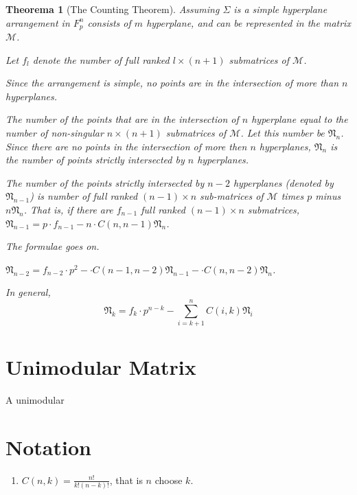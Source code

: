\documentclass[12pt, a4paper]{article}
\newtheorem{theorem}{Theorema}[subsection]
\theoremstyle{definition}
\theoremstyle{remark}
\begin{document}
\begin{theorem}[The Counting Theorem]
	Assuming $\Sigma$ is a simple hyperplane arrangement in $F_p^n$ consists of $m$ hyperplane, and can be represented in the matrix $\mathcal{M}$. 

	Let $f_{l}$ denote the number of full ranked $l \times (n
	+ 1)$ submatrices of $\mathcal{M}$.

	Since the arrangement is simple, no points are in the intersection of more than $n$ hyperplanes. 

	The number of the points that are in the intersection of $n$ hyperplane equal to the number of non-singular $n \times (n + 1)$ submatrices of $\mathcal{M}$. Let this number be $\mathfrak{N}_n$. Since there are no points in the intersection of more then $n$ hyperplanes, $\mathfrak{N}_n$ is the number of points strictly intersected by $n$ hyperplanes. 

	The number of the points strictly intersected by $n-2$ hyperplanes (denoted by $\mathfrak{N}_{n-1}$) is number of full ranked $(n-1) \times n$ sub-matrices of $\mathcal{M}$ times $p$ minus  $n\mathfrak{N}_{n}$. That is, if there are $f_{n-1}$ full ranked $(n-1) \times n$ submatrices, $\mathfrak{N}_{n-1} = p \cdot f_{n-1} - n \cdot C(n, n-1) \mathfrak{N}_n$.

	The formulae goes on.

	$\mathfrak{N}_{n-2} = f_{n-2} \cdot p^2 -  \cdot C(n-1, n-2) \mathfrak{N}_{n-1} - \cdot C(n, n-2) \mathfrak{N}_{n}$.

	In general, 
	\begin{equation}
		\mathfrak{N}_{k} = f_{k} \cdot p^{n-k} - \sum_{i = k+1}^{n} C(i, k) \mathfrak{N}_{i}
	\end{equation}
\end{theorem}

\section{Unimodular Matrix}

A unimodular 

\section*{Notation}

\begin{enumerate}
	\item $C(n, k) = \frac{n!}{k!(n-k)!}$, that is $n$ choose $k$.
\end{enumerate}
\end{document}
